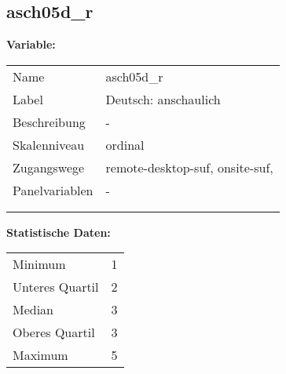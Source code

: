 	
	
	\subsection{asch05d\_r}
	\label{subSection:asch05d_r}

	\noindent\textbf{Variable:}\\
		\begin{tabular}{lL{11.3cm}}
			\label{tableVariable:asch05d_r}
			Name & asch05d\_r \\
			Label & Deutsch: anschaulich \\
			Beschreibung & - \\
			Skalenniveau & ordinal \\
			Zugangswege &
				remote-desktop-suf,
				onsite-suf,
 \\
			Panelvariablen & -
			 \\
			 \\
 \\
		\end{tabular}



		\vspace*{1 cm}
		\noindent\textbf{Statistische Daten:}\\
			\begin{tabular}{ll}
				\label{tableStatistics:asch05d_r}
					Minimum & 1 \\
					Unteres Quartil & 2 \\
					Median & 3 \\
					Oberes Quartil & 3 \\
					Maximum & 5 \\
			\end{tabular}



